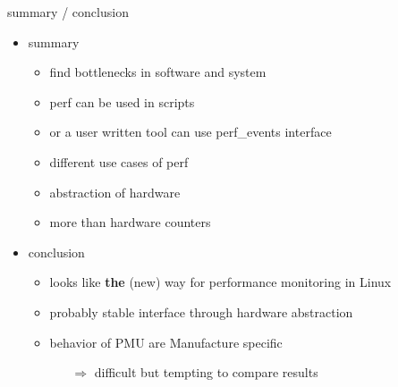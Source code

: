 \begin{frame}{summary / conclusion}
\begin{itemize}
  \item summary
  \begin{itemize}
    \item find bottlenecks in software and system
    \item perf can be used in scripts
    \item or a user written tool can use perf\_events interface
    \item different use cases of perf
    \item abstraction of hardware
    \item more than hardware counters
  \end{itemize}
\pause
  \item conclusion
  \begin{itemize}
    \item looks like \textbf{the} (new) way for performance monitoring in Linux
    \item probably stable interface through hardware abstraction
    \item behavior of PMU are Manufacture specific
    \begin{itemize}
      \item[$\Rightarrow$] difficult but tempting to compare results
    \end{itemize}
  \end{itemize}
\end{itemize}
\end{frame}



